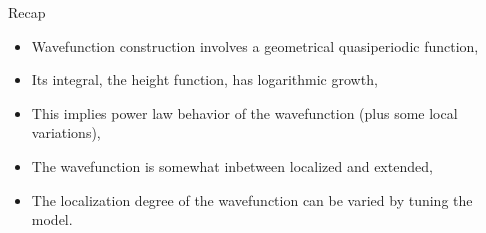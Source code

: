\documentclass[xcolor=x11names,compress,professionalfonts]{beamer}
\renewcommand{\(}{\begin{columns}}
\renewcommand{\)}{\end{columns}}
\newcommand{\<}[1]{\begin{column}{#1}}
\renewcommand{\>}{\end{column}}
\begin{document}
\begin{frame}{Recap}
\begin{itemize}
	\item Wavefunction construction involves a geometrical quasiperiodic function,
	\item Its integral, the height function, has logarithmic growth,
	\item This implies power law behavior of the wavefunction (plus some local variations),
	\item The wavefunction is somewhat inbetween localized and extended,
	\item The localization degree of the wavefunction can be varied by tuning the model.
\end{itemize}
\end{frame}
\end{document}
